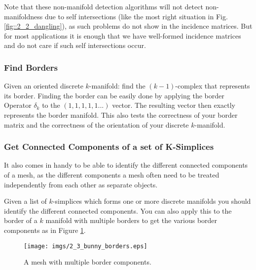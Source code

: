 	
Note that these non-manifold detection algorithms will not detect non-manifoldness due to self intersections (like the most right situation in Fig. \ref{fig::2_2_dangling}), as such problems do not show in the incidence matrices. But for most applications it is enough that we have well-formed incidence matrices and do not care if such self intersections occur.
	
\subsubsection{Find Borders}
Given an oriented discrete $k$-manifold: find the $(k-1)$-complex that represents its border. Finding the border can be easily done by applying the border Operator $\delta_k$ to the $(1,1,1,1,1...)$ vector. The resulting vector then exactly represents the border manifold. This also tests the correctness of your border matrix and the correctness of the orientation of your discrete $k$-manifold.
	
\subsubsection{Get Connected Components of a set of K-Simplices}
It also comes in handy to be able to identify the different connected components of a mesh, as the different components a mesh often need to be treated independently from each other as separate objects.
	
Given a list of $k$-simplices which forms one or more discrete manifolds you should identify the different connected components. You can also apply this
to the border of a $k$ manifold with multiple borders to get the various border components as in Figure \ref{fig::2_3_bunnyBorder}.
	
\begin{figure}[t]
	\begin{center}
	\texttt{[image: imgs/2\_3\_bunny\_borders.eps]}
	\end{center}
	\caption{A mesh with multiple border components.}
	\label{fig::2_3_bunnyBorder}
\end{figure}

